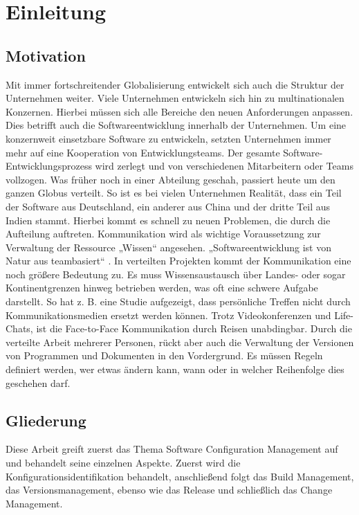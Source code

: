 \chapter {Einleitung}

\section {Motivation}
Mit immer fortschreitender Globalisierung entwickelt sich auch die Struktur der Unternehmen weiter. Viele Unternehmen entwickeln sich hin zu multinationalen Konzernen. Hierbei müssen sich alle Bereiche den neuen Anforderungen anpassen. Dies betrifft auch die Softwareentwicklung innerhalb der Unternehmen. Um eine konzernweit einsetzbare Software zu entwickeln, setzten Unternehmen immer mehr auf eine Kooperation von Entwicklungsteams. Der gesamte Software-Entwicklungsprozess wird zerlegt und von verschiedenen Mitarbeitern oder Teams vollzogen. Was früher noch in einer Abteilung geschah, passiert heute um den ganzen Globus verteilt. So ist es bei vielen Unternehmen Realität, dass ein Teil der Software aus Deutschland, ein anderer aus China und der dritte Teil aus Indien stammt. Hierbei kommt es schnell zu neuen Problemen, die durch die Aufteilung auftreten. Kommunikation wird als wichtige Voraussetzung zur Verwaltung der Ressource „Wissen“ angesehen. „Softwareentwicklung ist von Natur aus teambasiert“ \cite{einleitung}. In verteilten Projekten kommt der Kommunikation eine noch größere Bedeutung zu. Es muss Wissensaustausch über Landes- oder sogar Kontinentgrenzen hinweg betrieben werden, was oft eine schwere Aufgabe darstellt. So hat \acs{z. B.} eine Studie aufgezeigt, dass persönliche Treffen nicht durch Kommunikationsmedien ersetzt werden können. Trotz Videokonferenzen und Life-Chats, ist die Face-to-Face Kommunikation durch Reisen unabdingbar. Durch die verteilte Arbeit mehrerer Personen, rückt aber auch die Verwaltung der Versionen von Programmen und Dokumenten in den Vordergrund. Es müssen Regeln definiert werden, wer etwas ändern kann, wann oder in welcher Reihenfolge dies geschehen darf. 
\section{Gliederung}
Diese Arbeit greift zuerst das Thema Software Configuration Management auf und behandelt seine einzelnen Aspekte.
Zuerst wird die Konfigurationsidentifikation behandelt, anschließend folgt das Build Management, das Versionsmanagement, ebenso wie das Release und schließlich das Change Management.
